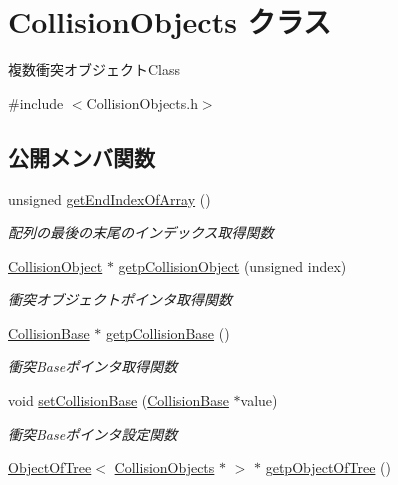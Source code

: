 \hypertarget{class_collision_objects}{}\section{Collision\+Objects クラス}
\label{class_collision_objects}


複数衝突オブジェクト\+Class  




{\ttfamily \#include $<$Collision\+Objects.\+h$>$}

\subsection*{公開メンバ関数}
\begin{DoxyCompactItemize}
\item 
unsigned \mbox{\hyperlink{class_collision_objects_a309eef4695b4a19f389eaf5d0753c256}{get\+End\+Index\+Of\+Array}} ()
\begin{DoxyCompactList}\small\item\em 配列の最後の末尾のインデックス取得関数 \end{DoxyCompactList}\item 
\mbox{\hyperlink{class_collision_object}{Collision\+Object}} $\ast$ \mbox{\hyperlink{class_collision_objects_abbd4e5dff1d28f403125637edd08b780}{getp\+Collision\+Object}} (unsigned index)
\begin{DoxyCompactList}\small\item\em 衝突オブジェクトポインタ取得関数 \end{DoxyCompactList}\item 
\mbox{\hyperlink{class_collision_base}{Collision\+Base}} $\ast$ \mbox{\hyperlink{class_collision_objects_af987979a8d2f976909e4b1e1f3485dd3}{getp\+Collision\+Base}} ()
\begin{DoxyCompactList}\small\item\em 衝突\+Baseポインタ取得関数 \end{DoxyCompactList}\item 
void \mbox{\hyperlink{class_collision_objects_a144f0c9160c0dda1579c26a0726fdbb6}{set\+Collision\+Base}} (\mbox{\hyperlink{class_collision_base}{Collision\+Base}} $\ast$value)
\begin{DoxyCompactList}\small\item\em 衝突\+Baseポインタ設定関数 \end{DoxyCompactList}\item 
\mbox{\hyperlink{class_object_of_tree}{Object\+Of\+Tree}}$<$ \mbox{\hyperlink{class_collision_objects}{Collision\+Objects}} $\ast$ $>$ $\ast$ \mbox{\hyperlink{class_collision_objects_aed262a89043cfb50a9211a35587d6ade}{getp\+Object\+Of\+Tree}} ()

\end{DoxyCompactItemize}
